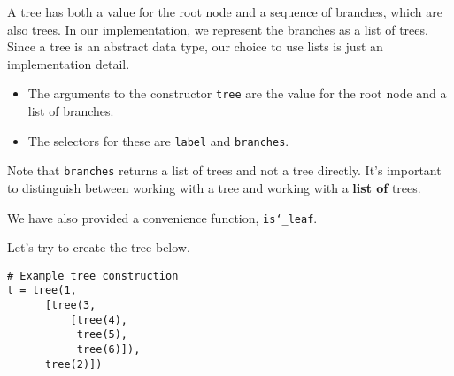A tree has both a value for the root node and a sequence of branches,
which are also trees. In our implementation, we represent the branches as
a list of trees. Since a tree is an abstract data type, our choice to use
lists is just an implementation detail.

\begin{itemize}
\item The arguments to the constructor \texttt{tree} are the value for
    the root node and a list of branches.
\item The selectors for these are \texttt{label} and \texttt{branches}.
\end{itemize}

\medskip

Note that \texttt{branches} returns a list of trees and not a tree directly.
It's important to distinguish between working with a tree and working with a
\textbf{list of} trees.

We have also provided a convenience function, \texttt{is\char`_leaf}.

\medskip
Let's try to create the tree below.

\begin{center}
\end{center}

\begin{lstlisting}
# Example tree construction
t = tree(1,
      [tree(3,
          [tree(4),
           tree(5),
           tree(6)]),
      tree(2)])
\end{lstlisting}
